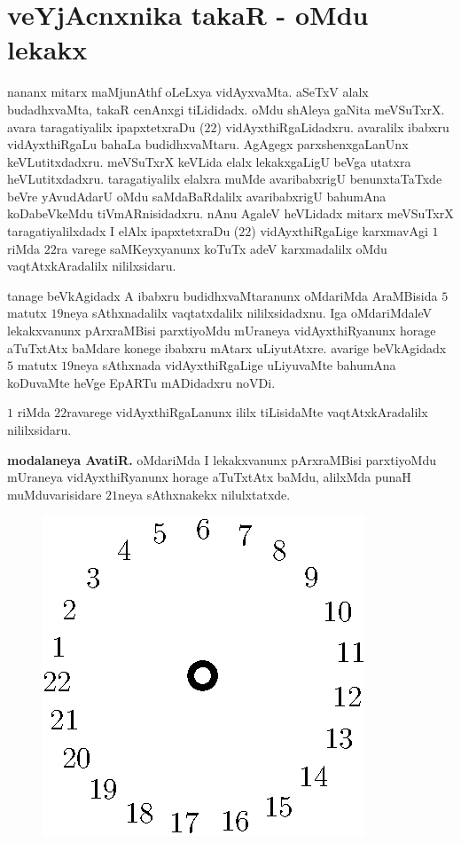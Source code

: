 \chapter{veYjAcnxnika takaR - oMdu lekakx}

\qquad nananx mitarx maMjunAthf oLeLxya vidAyxvaMta. aSeTxV alalx budadhxvaMta, takaR cenAnxgi tiLididadx. oMdu shAleya gaNita meVSuTxrX. avara taragatiyalilx ipapxtetxraDu ($22$) vidAyxthiRgaLidadxru. avaralilx ibabxru vidAyxthiRgaLu bahaLa budidhxvaMtaru. AgAgegx parxshenxgaLanUnx keVLutitxdadxru. meVSuTxrX keVLida elalx lekakxgaLigU beVga utatxra heVLutitxdadxru. taragatiyalilx elalxra muMde avaribabxrigU benunxtaTaTxde beVre yAvudAdarU oMdu saMdaBaRdalilx avaribabxrigU bahumAna koDabeVkeMdu tiVmARnisidadxru. nAnu AgaleV heVLidadx mitarx meVSuTxrX taragatiyalilxdadx I elAlx ipapxtetxraDu ($22$) vidAyxthiRgaLige karxmavAgi $1$ riMda $22$ra varege saMKeyxyanunx koTuTx adeV karxmadalilx oMdu vaqtAtxkAradalilx nililxsidaru.

tanage beVkAgidadx A ibabxru budidhxvaMtaranunx oMdariMda AraMBisida $5$ matutx $19$neya sAthxnadalilx vaqtatxdalilx nililxsidadxnu. Iga oMdariMdaleV lekakxvanunx pArxraMBisi parxtiyoMdu mUraneya vidAyxthiRyanunx horage aTuTxtAtx baMdare konege ibabxru mAtarx uLiyutAtxre. avarige beVkAgidadx $5$ matutx $19$neya sAthxnada vidAyxthiRgaLige uLiyuvaMte bahumAna koDuvaMte heVge EpARTu mADidadxru noVDi.

$1$ riMda $22$ravarege vidAyxthiRgaLanunx ililx tiLisidaMte vaqtAtxkAradalilx nililxsidaru.

{\bf modalaneya AvatiR.} oMdariMda I lekakxvanunx pArxraMBisi parxtiyoMdu mUraneya vidAyxthiRyanunx horage aTuTxtAtx baMdu, alilxMda punaH muMduvarisidare $21$neya sAthxnakekx nilulxtatxde.
\begin{figure}[H]
\centering
\includegraphics[scale=0.8]{src/figures/fig8.eps}
\end{figure}

